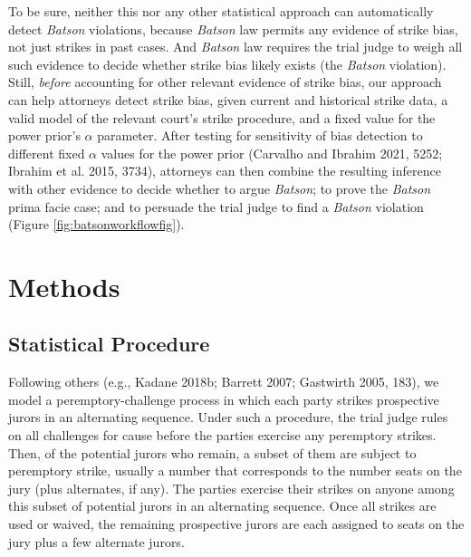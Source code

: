 \documentclass[12pt]{article}
\begin{document}
To be sure, neither this nor any other statistical approach can automatically detect \emph{Batson} violations, because \emph{Batson} law permits any evidence of strike bias, not just strikes in past cases. And \emph{Batson} law requires the trial judge to weigh all such evidence to decide whether strike bias likely exists (the \emph{Batson} violation). Still, \emph{before} accounting for other relevant evidence of strike bias, our approach can help attorneys detect strike bias, given current and historical strike data, a valid model of the relevant court's strike procedure, and a fixed value for the power prior's \(\alpha\) parameter. After testing for sensitivity of bias detection to different fixed \(\alpha\) values for the power prior (Carvalho and Ibrahim 2021, 5252; Ibrahim et al. 2015, 3734), attorneys can then combine the resulting inference with other evidence to decide whether to argue \emph{Batson}; to prove the \emph{Batson} prima facie case; and to persuade the trial judge to find a \emph{Batson} violation (Figure \ref{fig:batsonworkflowfig}).

\hypertarget{methods}{%
\section{Methods}\label{methods}}

\hypertarget{statistical-procedure}{%
\subsection{Statistical Procedure}\label{statistical-procedure}}

Following others (e.g., Kadane 2018b; Barrett 2007; Gastwirth 2005, 183), we model a peremptory-challenge process in which each party strikes prospective jurors in an alternating sequence. Under such a procedure, the trial judge rules on all challenges for cause before the parties exercise any peremptory strikes. Then, of the potential jurors who remain, a subset of them are subject to peremptory strike, usually a number that corresponds to the number seats on the jury (plus alternates, if any). The parties exercise their strikes on anyone among this subset of potential jurors in an alternating sequence. Once all strikes are used or waived, the remaining prospective jurors are each assigned to seats on the jury plus a few alternate jurors.
\end{document}
